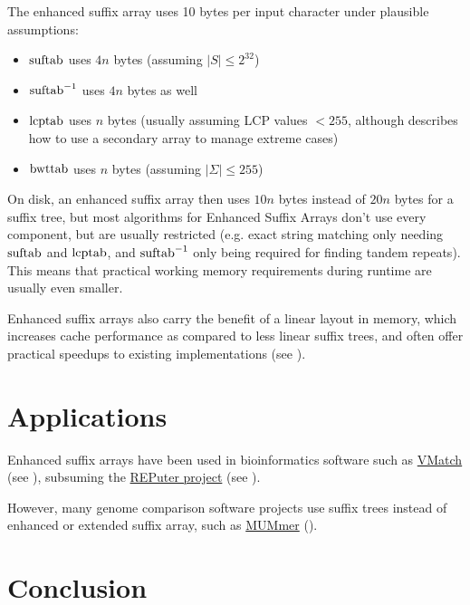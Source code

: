 \documentclass[a4paper,10pt]{article}
\begin{document}
The enhanced suffix array uses 10 bytes per input character under plausible
assumptions:

\begin{itemize}
\item $\hbox{suftab}$ uses $4n$ bytes (assuming $|S| \le 2^{32}$)
\item $\hbox{suftab}^{-1}$ uses $4n$ bytes as well
\item $\hbox{lcptab}$ uses $n$ bytes (usually assuming LCP values $<255$, although \citealt{abouelhoda2004replacing} describes how to use a secondary array to manage extreme cases)
\item $\hbox{bwttab}$ uses $n$ bytes (assuming $|\Sigma| \le 255$)
\end{itemize}

On disk, an enhanced suffix array then uses $10n$ bytes instead of
$20n$ bytes for a suffix tree, but most algorithms for Enhanced Suffix
Arrays don't use every component, but are usually restricted (e.g. exact
string matching only needing $\hbox{suftab}$ and $\hbox{lcptab}$, and
$\hbox{suftab}^{-1}$ only being required for finding tandem repeats).
This means that practical working memory requirements during runtime
are usually even smaller.

Enhanced suffix arrays also carry the benefit of a linear layout
in memory, which increases cache performance as compared to less
linear suffix trees, and often offer practical speedups to existing
implementations (see \citealt[sec. 7]{abouelhoda2002enhanced}).

\section*{Applications}

Enhanced suffix arrays have been used in bioinformatics
software such as \href{http://vmatch.de/}{VMatch}
(see \citealt{kurtz2003vmatch}), subsuming the
\href{https://bibiserv.cebitec.uni-bielefeld.de/reputer/}{REPuter project}
(see \citealt{kurtz2001reputer}).

However, many genome comparison software projects use
suffix trees instead of enhanced or extended suffix array,
such as \href{http://mummer.sourceforge.net/}{MUMmer}
(\citealt{kurtz2004versatile}).

\section*{Conclusion}
\end{document}
